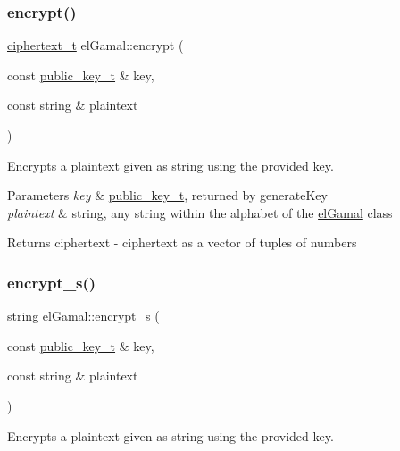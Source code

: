 \subsubsection{\texorpdfstring{encrypt()}{encrypt()}}
{\footnotesize\ttfamily \mbox{\hyperlink{structelGamal_1_1ciphertext__t}{ciphertext\+\_\+t}} el\+Gamal\+::encrypt (\begin{DoxyParamCaption}\item[{const \mbox{\hyperlink{structelGamal_1_1public__key__t}{public\+\_\+key\+\_\+t}} \&}]{key,  }\item[{const string \&}]{plaintext }\end{DoxyParamCaption})}



Encrypts a plaintext given as string using the provided key. 


\begin{DoxyParams}{Parameters}
{\em key} & \mbox{\hyperlink{structelGamal_1_1public__key__t}{public\+\_\+key\+\_\+t}}, returned by generate\+Key \\
\hline
{\em plaintext} & string, any string within the alphabet of the \mbox{\hyperlink{namespaceelGamal}{el\+Gamal}} class\\
\hline
\end{DoxyParams}
\begin{DoxyReturn}{Returns}
ciphertext -\/ ciphertext as a vector of tuples of numbers 
\end{DoxyReturn}
\mbox{\label{namespaceelGamal_af1b50ebf015473027eadf9ba9f12ba95}} 
\subsubsection{\texorpdfstring{encrypt\+\_\+s()}{encrypt\_s()}}
{\footnotesize\ttfamily string el\+Gamal\+::encrypt\+\_\+s (\begin{DoxyParamCaption}\item[{const \mbox{\hyperlink{structelGamal_1_1public__key__t}{public\+\_\+key\+\_\+t}} \&}]{key,  }\item[{const string \&}]{plaintext }\end{DoxyParamCaption})}



Encrypts a plaintext given as string using the provided key. 


